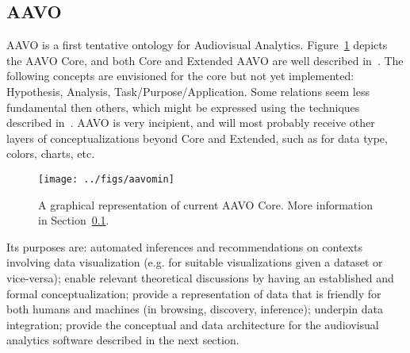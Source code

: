 \documentclass[letterpaper,10pt]{article}
\begin{document}
\subsection{AAVO}\label{sec:aavo}
AAVO is a first tentative ontology for Audiovisual Analytics.
Figure~\ref{aavo} depicts the AAVO Core,
and both Core and Extended AAVO are well described in~\cite{aavo}.
The following concepts are envisioned for the core
but not yet implemented:
Hypothesis, Analysis, Task/Purpose/Application.
Some relations seem less fundamental then others,
which might be expressed using the techniques described
in~\cite{ont}.
AAVO is very incipient, and will most probably receive
other layers of conceptualizations beyond Core and Extended,
such as for data type, colors, charts, etc.

\begin{figure}[htbp]
  \centering
  \texttt{[image: ../figs/aavomin]}
\caption{A graphical representation of current AAVO Core.
	More information in Section~\ref{sec:aavo}.}\label{aavo}
\end{figure}

Its purposes are: automated inferences and recommendations on
contexts involving data visualization (e.g. for suitable visualizations given a
dataset or vice-versa);
enable relevant theoretical discussions by having an
established and formal conceptualization;
provide a representation of data that is friendly for
both humans and machines (in browsing, discovery, inference);
underpin data integration;
provide the conceptual and data architecture for
the audiovisual analytics software described in
the next section.
\end{document}
